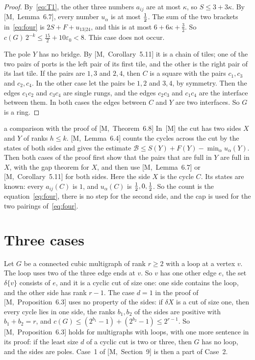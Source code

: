 \documentclass[11pt]{article}
\newcommand{\M}[1]{[M,~#1]}
\begin{document}
\begin{proof}
 By~\eqref{eq:T1}, the other three numbers
$a_{ij}$ are at most $\kappa$, so $S\le3+3\kappa$. By \M{Lemma~6.7}, every number $u_\alpha$ is at
most $\tfrac12$. The sum of the two brackets in~\eqref{eq:four} is $2S+F+u_{13|24}$, and this is at
most $6+6\kappa+\frac32$. So $c(G)\,2^{-k}\le\frac{15}2+10\varepsilon_0<8$. This case does not
occur.

 The pole $Y$ has no
bridge. By \M{Corollary~5.11} it is a chain of tiles; one of the two pairs of ports is the left
pair of its first tile, and the other is the right pair of its last tile. If the pairs are $1,3$
and $2,4$, then $C$ is a square with the pairs $c_1,c_3$ and $c_2,c_4$. In the other case let the
pairs be $1,2$ and $3,4$, by symmetry. Then the edges $c_1c_2$ and $c_3c_4$ are single rungs, and
the edges $c_2c_3$ and $c_1c_4$ are the interface between them. In both cases the edges between
$C$ and $Y$ are two interfaces. So $G$ is a ring.
\end{proof}

\begin{idea}{a comparison with the proof of \M{Theorem~6.8}}
In~[M] the cut has two sides $X$ and $Y$ of ranks $h\le k$. \M{Lemma~6.4} counts the cycles
across the cut by the states of both sides and gives the estimate
$\mathcal B\le S(Y)+F(Y)-\min_\alpha u_\alpha(Y)$. Then both cases of the proof first show that
the pairs that are full in $Y$ are full in $X$, with the gap theorem for $X$, and then use
\M{Lemma~6.7} or \M{Corollary~5.11} for both sides. Here the side $X$ is the cycle $C$. Its
states are known: every $a_{ij}(C)$ is $1$, and $u_\alpha(C)$ is $\tfrac12,0,\tfrac12$. So the count is
the equation~\eqref{eq:four}, there is no step for the second side, and the cap is used for the
two pairings of~\eqref{eq:four}.
\end{idea}

\section{Three cases}\label{sec:three}

Let $G$ be a connected cubic multigraph of rank $r\ge2$ with a loop at a vertex $v$. The loop
uses two of the three edge ends at $v$. So $v$ has one other edge $e$, the set $\delta\{v\}$
consists of $e$, and it is a cyclic cut of size one: one side contains the loop, and the other
side has rank $r-1$. The case $d=1$ in the proof of \M{Proposition~6.3} uses no property of the
sides: if $\delta X$ is a cut of size one, then every cycle lies in one side, the ranks $b_1,b_2$
of the sides are positive with $b_1+b_2=r$, and $c(G)\le(2^{b_1}-1)+(2^{b_2}-1)\le2^{r-1}$. So
\M{Proposition~6.3} holds for multigraphs with loops, with one more sentence in its proof: if
the least size $d$ of a cyclic cut is two or three, then $G$ has no loop, and the sides are
poles. Case~1 of \M{Section~9} is then a part of Case~2.
\end{document}
